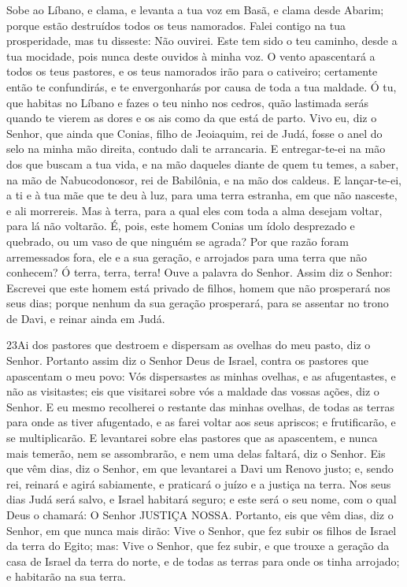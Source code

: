 Sobe ao Líbano, e clama, e levanta a tua voz em Basã, e clama
desde Abarim; porque estão destruídos todos os teus namorados.
Falei contigo na tua prosperidade, mas tu disseste: Não
ouvirei. Este tem sido o teu caminho, desde a tua mocidade, pois
nunca deste ouvidos à minha voz. O vento apascentará a todos
os teus pastores, e os teus namorados irão para o cativeiro;
certamente então te confundirás, e te envergonharás por causa de
toda a tua maldade. Ó tu, que habitas no Líbano e fazes o teu
ninho nos cedros, quão lastimada serás quando te vierem as dores e
os ais como da que está de parto. Vivo eu, diz o Senhor, que
ainda que Conias, filho de Jeoiaquim, rei de Judá, fosse o anel do
selo na minha mão direita, contudo dali te arrancaria. E
entregar-te-ei na mão dos que buscam a tua vida, e na mão daqueles
diante de quem tu temes, a saber, na mão de Nabucodonosor, rei de
Babilônia, e na mão dos caldeus. E lançar-te-ei, a ti e à tua
mãe que te deu à luz, para uma terra estranha, em que não nasceste,
e ali morrereis. Mas à terra, para a qual eles com toda a
alma desejam voltar, para lá não voltarão. É, pois, este
homem Conias um ídolo desprezado e quebrado, ou um vaso de que
ninguém se agrada? Por que razão foram arremessados fora, ele e a
sua geração, e arrojados para uma terra que não conhecem? Ó
terra, terra, terra! Ouve a palavra do Senhor. Assim diz o
Senhor: Escrevei que este homem está privado de filhos, homem que
não prosperará nos seus dias; porque nenhum da sua geração
prosperará, para se assentar no trono de Davi, e reinar ainda em
Judá.

\medskip

\lettrine{23} Ai dos pastores que destroem e dispersam as
ovelhas do meu pasto, diz o Senhor. Portanto assim diz o Senhor
Deus de Israel, contra os pastores que apascentam o meu povo: Vós
dispersastes as minhas ovelhas, e as afugentastes, e não as
visitastes; eis que visitarei sobre vós a maldade das vossas ações,
diz o Senhor. E eu mesmo recolherei o restante das minhas
ovelhas, de todas as terras para onde as tiver afugentado, e as
farei voltar aos seus apriscos; e frutificarão, e se multiplicarão.
E levantarei sobre elas pastores que as apascentem, e nunca mais
temerão, nem se assombrarão, e nem uma delas faltará, diz o Senhor.
Eis que vêm dias, diz o Senhor, em que levantarei a Davi um
Renovo justo; e, sendo rei, reinará e agirá sabiamente, e praticará
o juízo e a justiça na terra. Nos seus dias Judá será salvo, e
Israel habitará seguro; e este será o seu nome, com o qual Deus o
chamará: O Senhor JUSTIÇA NOSSA. Portanto, eis que vêm dias, diz
o Senhor, em que nunca mais dirão: Vive o Senhor, que fez subir os
filhos de Israel da terra do Egito; mas: Vive o Senhor, que fez
subir, e que trouxe a geração da casa de Israel da terra do norte, e
de todas as terras para onde os tinha arrojado; e habitarão na sua
terra.

